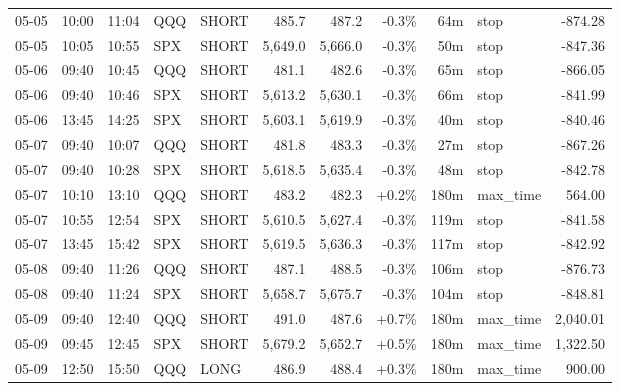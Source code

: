 \documentclass[11pt,a4paper,twoside]{article}
\begin{document}
\begin{center}
\begin{longtable}{>{\color{txtmain}}l l l l l r r r r >{\color{txtmain}}l r}
05-05 & 10:00 & 11:04 & QQQ & SHORT & 485.7 & 487.2 & \textcolor{lossred}{-0.3\%} & 64m & stop & \textcolor{lossred}{-874.28} \\
05-05 & 10:05 & 10:55 & SPX & SHORT & 5,649.0 & 5,666.0 & \textcolor{lossred}{-0.3\%} & 50m & stop & \textcolor{lossred}{-847.36} \\
05-06 & 09:40 & 10:45 & QQQ & SHORT & 481.1 & 482.6 & \textcolor{lossred}{-0.3\%} & 65m & stop & \textcolor{lossred}{-866.05} \\
05-06 & 09:40 & 10:46 & SPX & SHORT & 5,613.2 & 5,630.1 & \textcolor{lossred}{-0.3\%} & 66m & stop & \textcolor{lossred}{-841.99} \\
05-06 & 13:45 & 14:25 & SPX & SHORT & 5,603.1 & 5,619.9 & \textcolor{lossred}{-0.3\%} & 40m & stop & \textcolor{lossred}{-840.46} \\
05-07 & 09:40 & 10:07 & QQQ & SHORT & 481.8 & 483.3 & \textcolor{lossred}{-0.3\%} & 27m & stop & \textcolor{lossred}{-867.26} \\
05-07 & 09:40 & 10:28 & SPX & SHORT & 5,618.5 & 5,635.4 & \textcolor{lossred}{-0.3\%} & 48m & stop & \textcolor{lossred}{-842.78} \\
05-07 & 10:10 & 13:10 & QQQ & SHORT & 483.2 & 482.3 & \textcolor{wingreen}{+0.2\%} & 180m & max\_time & \textcolor{wingreen}{564.00} \\
05-07 & 10:55 & 12:54 & SPX & SHORT & 5,610.5 & 5,627.4 & \textcolor{lossred}{-0.3\%} & 119m & stop & \textcolor{lossred}{-841.58} \\
05-07 & 13:45 & 15:42 & SPX & SHORT & 5,619.5 & 5,636.3 & \textcolor{lossred}{-0.3\%} & 117m & stop & \textcolor{lossred}{-842.92} \\
05-08 & 09:40 & 11:26 & QQQ & SHORT & 487.1 & 488.5 & \textcolor{lossred}{-0.3\%} & 106m & stop & \textcolor{lossred}{-876.73} \\
05-08 & 09:40 & 11:24 & SPX & SHORT & 5,658.7 & 5,675.7 & \textcolor{lossred}{-0.3\%} & 104m & stop & \textcolor{lossred}{-848.81} \\
05-09 & 09:40 & 12:40 & QQQ & SHORT & 491.0 & 487.6 & \textcolor{wingreen}{+0.7\%} & 180m & max\_time & \textcolor{wingreen}{2,040.01} \\
05-09 & 09:45 & 12:45 & SPX & SHORT & 5,679.2 & 5,652.7 & \textcolor{wingreen}{+0.5\%} & 180m & max\_time & \textcolor{wingreen}{1,322.50} \\
05-09 & 12:50 & 15:50 & QQQ & LONG & 486.9 & 488.4 & \textcolor{wingreen}{+0.3\%} & 180m & max\_time & \textcolor{wingreen}{900.00} \\

\end{longtable}
\end{center}
\end{document}
